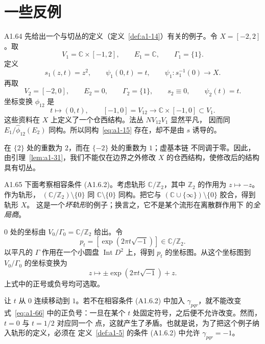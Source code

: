 
\section{一些反例}
\label{sec:a1-5}

\begin{example}{A1.64}\label{ex:a1-64}
先给出一个与切丛的定义（定义~\ref{def:a1-14}）有关的例子。令
$X=[-2,2]$。取
\[
 V_1=\mathbb C\times[-1,2],\qquad
 E_1=\mathbb C,\qquad
 \Gamma_1=\{1\}.
\]
定义
\[
 s_1(z,t)=z^2,\qquad
 \psi_1(0,t)=t,\qquad
 \psi_1\colon s_1^{-1}(0)\longrightarrow X.
\]
再取
\[
 V_2=[-2,0],\qquad E_2=0,\qquad
 \Gamma_2=\{1\},\qquad s_2\equiv0,\qquad \psi_2(t)=t.
\]
坐标变换 $\phi_{12}$ 是
\[
 t\longmapsto(0,t),\qquad
 [-1,0]=V_{12}\longrightarrow
 \mathbb C\times[-1,0]\subset V_1.
\]
这些资料在 $X$ 上定义了一个仓西结构。法丛 $NV_{12}V_1$ 显然平凡，
因而同 $E_1/\widehat\phi_{12}(E_2)$ 同构。所以同构~\eqref{eq:a1-15}
存在，却不是由 $s$ 诱导的。

在 $\{2\}$ 处的重数为 $2$，而在 $\{-2\}$ 处的重数为 $1$；虚基本链
不同调于零。因此，由引理~\ref{lem:a1-31}，我们不能仅在边界之外修改
$X$ 的仓西结构，使修改后的结构具有切丛。
\end{example}

\begin{example}{A1.65}\label{ex:a1-65}
下面考察相容条件 (A1.6.2)。考虑轨形 $\mathbb C/\mathbb Z_2$，其中
$\mathbb Z_2$ 的作用为 $z\mapsto-z$。作为轨形，
$(\mathbb C/\mathbb Z_2)\setminus\{0\}$ 同
$\mathbb C\setminus\{0\}$ 同构。把它与
$(\mathbb C\cup\{\infty\})\setminus\{0\}$ 胶合，得到轨形 $X$。
这是一个\emph{坏轨形}的例子；换言之，它不是某个流形在离散群作用下
的\emph{全局商}。

$0$ 处的坐标由 $V_0/\Gamma_0=\mathbb C/\mathbb Z_2$ 给出。令
\[
 p_t=[\exp(2\pi t\sqrt{-1})]\in\mathbb C/\mathbb Z_2.
\]
以平凡的 $\Gamma$ 作用在一个小圆盘 $\operatorname{Int}D^2$ 上，得到
$p_t$ 的坐标图。从这个坐标图到 $V_0/\Gamma_0$ 的坐标变换为
\begin{equation}
 z\longmapsto \pm\exp(2\pi t\sqrt{-1})+z.
 \tag{A1.66}\label{eq:a1-66}
\end{equation}
上式中的正号或负号均可选取。

让 $t$ 从 $0$ 连续移动到 $1$。若不在相容条件 (A1.6.2) 中加入
$\gamma_{pqr}$，就不能改变式~\eqref{eq:a1-66} 中的正负号：一旦在某个
$t$ 处固定符号，之后便不允许改变。然而，$t=0$ 与 $t=1/2$ 对应同一个
点，这就产生了矛盾。也就是说，为了把这个例子纳入轨形的定义，必须在
定义~\ref{def:a1-5} 的条件 (A1.6.2) 中允许
$\gamma_{pqr}=-1$。
\end{example}


